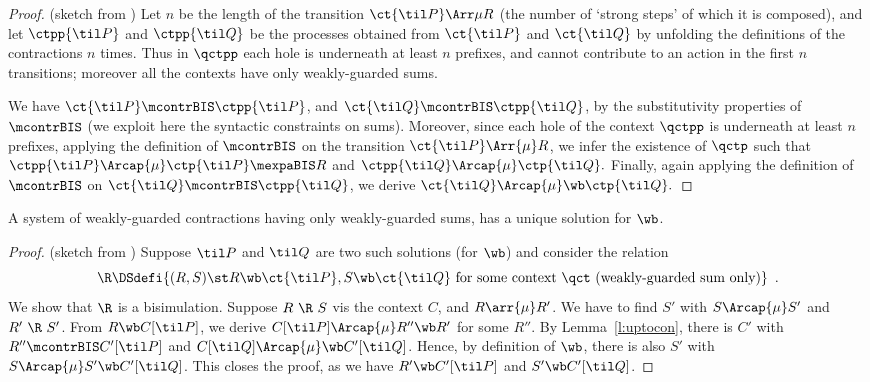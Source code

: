 \begin{proof}{(sketch from \cite{sangiorgi2017equations})}
Let $n$ be the length of the transition $\ct{\til P}\Arr\mu R$  (the
number of `strong steps' of which it is composed), and
let $\ctpp {\til P}$ and $\ctpp {\til Q}$  be the processes obtained
from  $\ct {\til P}$ and $\ct {\til Q}$ by unfolding the definitions
of the contractions $n$ times. Thus in $\qctpp$ each hole is
underneath at least $n$ prefixes, and cannot contribute to an action
in the first $n$ transitions; moreover all the contexts have only
weakly-guarded sums.

We have $\ct{\til P} \mcontrBIS \ctpp{\til P}$, and
$\ct{\til Q} \mcontrBIS \ctpp{\til Q}$,
 by the substitutivity  properties of $\mcontrBIS$ (we exploit here
 the syntactic constraints on sums). Moreover,
 since each hole of the  context $\qctpp$ is underneath at least $n$
 prefixes, applying
the definition
 of $ \mcontrBIS$ on the transition
 $\ct{\til P}\Arr{\mu}  R$, we infer the existence
 of $\qctp$ such that
$
\ctpp{\til P}\Arcap{\mu} \ctp{\til P} \mexpaBIS R
$
and
$
\ctpp{\til Q}\Arcap{\mu}  \ctp{\til Q}
. $
Finally, again applying the definition of $\mcontrBIS$ on
$\ct{\til Q} \mcontrBIS \ctpp{\til Q}$,
we derive
$
\ct{\til Q}\Arcap{\mu}  \wb \ctp{\til Q}
.$
\end{proof}

\begin{theorem}
\label{t:contraBisimulationU}
A system of weakly-guarded contractions
having only weakly-guarded sums, has a unique solution for $\wb$.
\end{theorem}

\begin{proof}{(sketch from \cite{sangiorgi2017equations})}
Suppose $\til P$ and $\til Q$ are two such solutions (for $\wb$) and consider
the relation
\begin{equation}
\label{eq:R}
\R \DSdefi \{
(R,S) \st R \wb \ct{\til P}, S \wb \ct{\til Q} \mbox{ for some context
$\qct$ (weakly-guarded sum only)} \} \enspace.
\end{equation}
We show that $\R$ is a bisimulation. Suppose $R\ \R\ S$ vis the context
$C$, and $R \arr{\mu} R'$. We have to find $S'$ with $S \Arcap{\mu}
S'$ and $R'\ \R\ S'$. From $R \wb C[{\til P}]$, we derive $C[{\til P}]
\Arcap{\mu} R'' \wb R'$ for some $R''$. By Lemma~\ref{l:uptocon},
there is $C'$ with $R'' \mcontrBIS C'[{\til P}]$ and $C[{\til Q}]
\Arcap{\mu} \wb C'[{\til Q}]$. Hence, by definition of $\wb$, there is
also $S'$ with $S \Arcap{\mu} S' \wb C'[{\til Q}]$. This closes the
proof, as we have $R' \wb C'[{\til P}]$ and $S' \wb C'[{\til Q}]$.
\end{proof}


